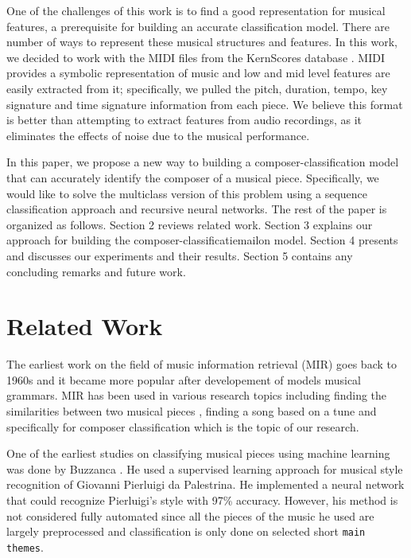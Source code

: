\documentclass[11pt,a4paper]{article}
\begin{document}
One of the challenges of this work is to find a good representation for musical features, a prerequisite for building an accurate classification model. There are number of ways to represent these musical structures and features.  In this work, we decided to work with the MIDI files from the KernScores database \cite{Kern}. MIDI provides a symbolic representation of music and low and mid level features are easily extracted from it; specifically, we pulled the pitch, duration, tempo, key signature and time signature information from each piece. We believe this format is better than attempting to extract features from audio recordings, as it eliminates the effects of noise due to the musical performance.

In this paper, we propose a new way to building a composer-classification model that can accurately identify the composer of a musical piece. Specifically, we would like to solve the multiclass version of this problem using a sequence classification approach and recursive neural networks. The rest of the paper is organized as follows. Section 2 reviews related work. Section 3 explains our approach for building the composer-classificatiemailon model. Section 4 presents and discusses our experiments and their results. Section 5 contains any concluding remarks and future work.


\section{Related Work}

The earliest work on the field of music information retrieval (MIR) goes back to 1960s \cite {Kassler} and it became more popular after developement of models musical grammars. MIR has been used in various research topics including finding the similarities between two musical pieces \cite{Berenzweig}, finding a song based on a tune \cite {Ghias} and specifically for composer classification which is the topic of our research.

One of the earliest studies on classifying musical pieces using machine learning was done by Buzzanca \cite{Buzz}. He used a supervised learning approach for musical style recognition of Giovanni Pierluigi da Palestrina. He implemented a neural network that could recognize Pierluigi's style with 97\% accuracy. However, his method is not considered fully automated since all the pieces of the music he used are largely preprocessed and classification is only done on selected short \texttt {main themes}.
\end{document}
